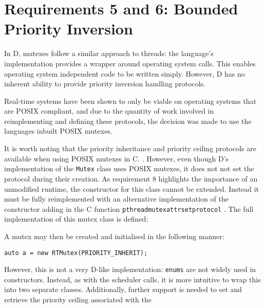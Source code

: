 \section{Requirements 5 and 6: Bounded Priority Inversion}
In D, mutexes follow a similar approach to threads: the language's
implementation provides a wrapper around operating system calls. This 
enables operating system independent code to be written simply. However, D has no 
inherent ability to provide priority inversion handling protocols. 
\par\bigskip\noindent
Real-time systems have been shown to only be viable on operating systems that 
are POSIX compliant, and due to the quantity of work involved in reimplementing 
and defining these protocols, the decision was made to use the languages
inbuilt POSIX mutexes. 
\par\bigskip\noindent
It is worth noting that the priority inheritance and priority ceiling protocols 
are available when using POSIX mutexes in C. 
\cite{mutex-setprotocol}. However, even though D's implementation of the \texttt{Mutex} 
class uses POSIX mutexes, it does not not set the protocol during their creation. 
As requirement 8 highlights the importance of an unmodified runtime, the 
constructor for this class cannot be extended. Instead it must be fully 
reimplemented with an alternative implementation of the constructor adding in 
the C function \texttt{pthread\textunderscore{}mutexattr\textunderscore{}setprotocol} \cite{mutex-setprotocol}. 
The full implementation of this mutex class is defined:

A mutex may then be created and initialised in the following manner: 
\begin{lstlisting}
auto a = new RTMutex(PRIORITY_INHERIT);
\end{lstlisting}
However, this is not a very D-like implementation: \texttt{enums} are not widely used 
in constructors. Instead, as with the scheduler calls, 
it is more intuitive to wrap this into two separate classes. Additionally, 
further support 
is needed to set and retrieve the priority ceiling associated with the 
